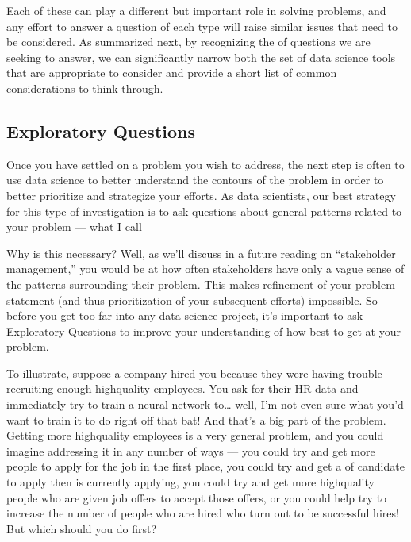 \documentclass[letterpaper,10pt,english]{jupyterBook}
\begin{document}
\sphinxAtStartPar
Each of these can play a different but important role in solving problems, and any effort to answer a question of each type will raise similar issues that need to be considered. As summarized next, by recognizing the  of questions we are seeking to answer, we can significantly narrow both the set of data science tools that are appropriate to consider and provide a short list of common considerations to think through.


\subsection{Exploratory Questions}
\label{\detokenize{10_introduction/22_question_types:exploratory-questions}}
\sphinxAtStartPar
Once you have settled on a problem you wish to address, the next step is often to use data science to better understand the contours of the problem in order to better prioritize and strategize your efforts. As data scientists, our best strategy for this type of investigation is to ask questions about general patterns related to your problem — what I call 

\sphinxAtStartPar
Why is this necessary? Well, as we’ll discuss in a future reading on “stakeholder management,” you would be  at how often stakeholders have only a vague sense of the patterns surrounding their problem. This makes refinement of your problem statement (and thus prioritization of your subsequent efforts) impossible. So before you get too far into any data science project, it’s important to ask Exploratory Questions to improve your understanding of how best to get at your problem.

\sphinxAtStartPar
To illustrate, suppose a company hired you because they were having trouble recruiting enough high\sphinxhyphen{}quality employees. You  ask for their HR data and immediately try to train a neural network to… well, I’m not even sure what you’d want to train it to do right off that bat! And that’s a big part of the problem. Getting more high\sphinxhyphen{}quality employees is a very general problem, and you could imagine addressing it in any number of ways — you could try and get more people to apply for the job in the first place, you could try and get a  of candidate to apply then is currently applying, you could try and get more high\sphinxhyphen{}quality people who are given job offers to accept those offers, or you could help try to increase the number of people who are hired who turn out to be successful hires! But which should you do first?
\end{document}
